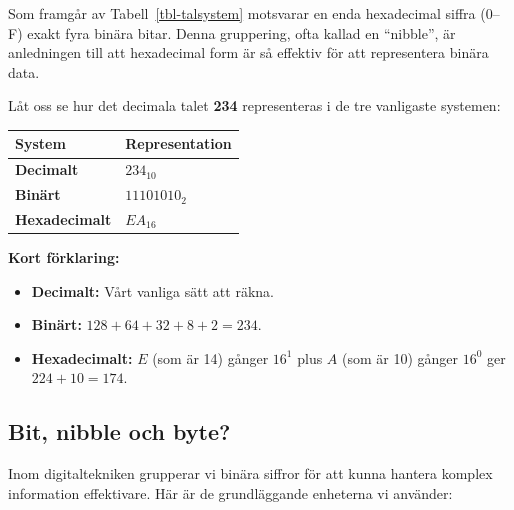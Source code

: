 \documentclass[
  swedish,
  letterpaper,
  oneside,
  openany]{book}
\newcounter{none} %
\providecommand{\tightlist}{%
  \setlength{\itemsep}{0pt}\setlength{\parskip}{0pt}}
\begin{document}
Som framgår av Tabell~\ref{tbl-talsystem} motsvarar en enda hexadecimal
siffra (0--F) exakt fyra binära bitar. Denna gruppering, ofta kallad en
``nibble'', är anledningen till att hexadecimal form är så effektiv för
att representera binära data.

\begin{tcolorbox}[enhanced jigsaw, arc=.35mm, bottomrule=.15mm, bottomtitle=1mm, breakable, colback=white, colbacktitle=quarto-callout-note-color!10!white, colframe=quarto-callout-note-color-frame, coltitle=black, left=2mm, leftrule=.75mm, opacityback=0, opacitybacktitle=0.6, rightrule=.15mm, title=\textcolor{quarto-callout-note-color}{\faInfo}\hspace{0.5em}{Exempel: Talet 234 i olika system}, titlerule=0mm, toprule=.15mm, toptitle=1mm]

Låt oss se hur det decimala talet \textbf{234} representeras i de tre
vanligaste systemen:

{\def\LTcaptype{none} %
\begin{longtable}[]{@{}ll@{}}
\toprule\noalign{}
System & Representation \\
\midrule\noalign{}
\endhead
\bottomrule\noalign{}
\endlastfoot
\textbf{Decimalt} & \(234_{10}\) \\
\textbf{Binärt} & \(11101010_2\) \\
\textbf{Hexadecimalt} & \(EA_{16}\) \\
\end{longtable}
}

\textbf{Kort förklaring:}

\begin{itemize}
\tightlist
\item
  \textbf{Decimalt:} Vårt vanliga sätt att räkna.
\item
  \textbf{Binärt:} \(128 + 64 + 32 + 8 + 2 = 234\).
\item
  \textbf{Hexadecimalt:} \(E\) (som är 14) gånger \(16^1\) plus \(A\)
  (som är 10) gånger \(16^0\) ger \(224 + 10 = 174\).
\end{itemize}

\end{tcolorbox}

\subsection{Bit, nibble och byte?}\label{bit-nibble-och-byte}

Inom digitaltekniken grupperar vi binära siffror för att kunna hantera
komplex information effektivare. Här är de grundläggande enheterna vi
använder:
\end{document}

